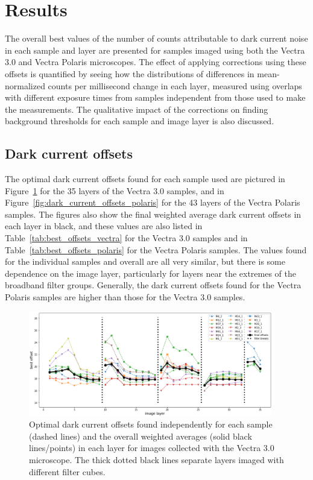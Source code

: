 \documentclass[letterpaper,11pt]{article}
\newcommand{\reffig}[1]{Figure~\ref{#1}}
\newcommand{\reftab}[1]{Table~\ref{#1}}
\begin{document}
\clearpage

\section{Results}
\label{sec:results}

The overall best values of the number of counts attributable to dark current noise in each sample and layer are presented for samples imaged using both the Vectra 3.0 and Vectra Polaris microscopes. The effect of applying corrections using these offsets is quantified by seeing how the distributions of differences in mean-normalized counts per millisecond change in each layer, measured using overlaps with different exposure times from samples independent from those used to make the measurements. The qualitative impact of the corrections on finding background thresholds for each sample and image layer is also discussed. 

\subsection{Dark current offsets}
\label{ssec:dark_current_offsets}

The optimal dark current offsets found for each sample used are pictured in \reffig{fig:dark_current_offsets_vectra} for the 35 layers of the Vectra 3.0 samples, and in \reffig{fig:dark_current_offsets_polaris} for the 43 layers of the Vectra Polaris samples. The figures also show the final weighted average dark current offsets in each layer in black, and these values are also listed in \reftab{tab:best_offsets_vectra} for the Vectra 3.0 samples and in \reftab{tab:best_offsets_polaris} for the Vectra Polaris samples. The values found for the individual samples and overall are all very similar, but there is some dependence on the image layer, particularly for layers near the extremes of the broadband filter groups. Generally, the dark current offsets found for the Vectra Polaris samples are higher than those for the Vectra 3.0 samples.

\begin{figure}[!ht]
\centering
\includegraphics[width=0.95\textwidth]{images/results/dark_current_offsets_vectra}
\caption{\footnotesize Optimal dark current offsets found independently for each sample (dashed lines) and the overall weighted averages (solid black lines/points) in each layer for images collected with the Vectra 3.0 microscope. The thick dotted black lines separate layers imaged with different filter cubes.}
\label{fig:dark_current_offsets_vectra}
\end{figure}
\end{document}
